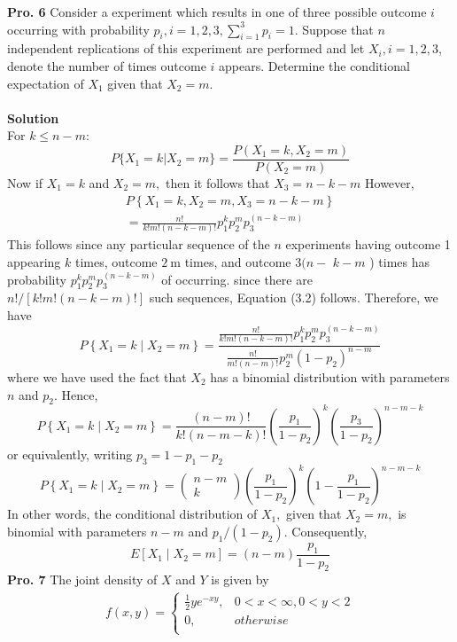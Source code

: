 \documentclass[12pt,onecolumn,journal]{IEEEtran}
\begin{document}
\textbf{Pro. 6} Consider a experiment which results in one of three possible outcome $i$ occurring with probability $p_i,i=1,2,3,\sum^3_{i=1}{p_i}=1$. Suppose that $n$ independent replications of this experiment are performed and let $X_i,i=1,2,3$, denote the number of times outcome $i$ appears. Determine the conditional expectation of $X_1$ given that $X_2=m$.\\
\\
\textbf{Solution}
\\
\textcolor[rgb]{1,0,0}
{
For $k \leq n-m$:
\[P\{X_1=k|X_2=m\}=\frac{P(X_1=k,X_2=m)}{P(X_2=m)}\]
Now if $X_{1}=k$ and $X_{2}=m,$ then it follows that $X_{3}=n-k-m$ However,
$$
\begin{array}{c}
P\left\{X_{1}=k, X_{2}=m, X_{3}=n-k-m\right\} \\
=\frac{n !}{k ! m !(n-k-m) !} p_{1}^{k} p_{2}^{m} p_{3}^{(n-k-m)}
\end{array}
$$
This follows since any particular sequence of the $n$ experiments having outcome 1 appearing $k$ times, outcome $2 \mathrm{~m}$ times, and outcome $3(n-$ $k-m$ ) times has probability $p_{1}^{k} p_{2}^{m} p_{3}^{(n-k-m)}$ of occurring. since there are $n ! /[k ! m !(n-k-m) !]$ such sequences, Equation (3.2) follows. Therefore, we have
$$
P\left\{X_{1}=k \mid X_{2}=m\right\}=\frac{\frac{n !}{k ! m !(n-k-m) !} p_{1}^{k} p_{2}^{m} p_{3}^{(n-k-m)}}{\frac{n !}{m !(n-m) !} p_{2}^{m}\left(1-p_{2}\right)^{n-m}}
$$
where we have used the fact that $X_{2}$ has a binomial distribution with parameters $n$ and $p_{2} .$ Hence,
$$
P\left\{X_{1}=k \mid X_{2}=m\right\}=\frac{(n-m) !}{k !(n-m-k) !}\left(\frac{p_{1}}{1-p_{2}}\right)^{k}\left(\frac{p_{3}}{1-p_{2}}\right)^{n-m-k}
$$
or equivalently, writing $p_{3}=1-p_{1}-p_{2}$
$$
P\left\{X_{1}=k \mid X_{2}=m\right\}=\left(\begin{array}{c}
n-m \\
k
\end{array}\right)\left(\frac{p_{1}}{1-p_{2}}\right)^{k}\left(1-\frac{p_{1}}{1-p_{2}}\right)^{n-m-k}
$$
In other words, the conditional distribution of $X_{1},$ given that $X_{2}=m,$ is binomial with parameters $n-m$ and $p_{1} /\left(1-p_{2}\right)$. Consequently,
$$
E\left[X_{1} \mid X_{2}=m\right]=(n-m) \frac{p_{1}}{1-p_{2}}
$$
}
\textbf{Pro. 7} The joint density of $X$ and $Y$ is given by
\begin{eqnarray*}%
f(x,y)=
               \begin{cases}
                \frac{1}{2}ye^{-xy},    & 0<x<\infty,0<y<2 \\
                 0,  & otherwise\\
               \end{cases}
\end{eqnarray*}
\end{document}
